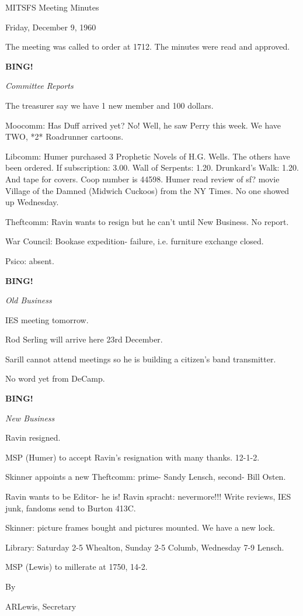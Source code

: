 \documentclass[12pt]{article}
\newcommand{\bing}{{\bf BING!} }
\newcommand{\goto}[1]{\bing \vskip 12pt \centerline{{\em{#1}}}}
\begin{document}
\begin{center}

MITSFS Meeting Minutes

Friday, December 9, 1960

\end{center}
 
\vspace{12pt}

\setlength{\parskip}{6pt}

\noindent
The meeting was called to order at 1712. The minutes were read and approved.

\goto{Committee Reports}

The treasurer say we have 1 new member and 100 dollars.

Moocomm: Has Duff arrived yet? No! Well, he saw Perry this week. We have TWO, *2* Roadrunner cartoons.

Libcomm: Humer purchased 3 Prophetic Novels of H.G. Wells. The others have been ordered. If subscription: 3.00. Wall of Serpents: 1.20. Drunkard's Walk: 1.20. And tape for covers. Coop number is 44598. Humer read review of sf? movie Village of the Damned (Midwich Cuckoos) from the NY Times. No one showed up Wednesday.

Theftcomm: Ravin wants to resign but he can't until New Business. No report.

War Council: Bookase expedition- failure, i.e. furniture exchange closed.

Psico: absent.

\goto{Old Business}

IES meeting tomorrow.

Rod Serling will arrive here 23rd December.

Sarill cannot attend meetings so he is building a citizen's band transmitter.

No word yet from DeCamp.

\goto{New Business}

Ravin resigned.

MSP (Humer) to accept Ravin's resignation with many thanks. 12-1-2.

Skinner appoints a new Theftcomm: prime- Sandy Lensch, second- Bill Osten.

Ravin wants to be Editor- he is! Ravin spracht: nevermore!!! Write reviews, IES junk, fandoms send to Burton 413C.

Skinner: picture frames bought and pictures mounted. We have a new lock.

Library: Saturday 2-5 Whealton, Sunday 2-5 Columb, Wednesday 7-9 Lensch.

MSP (Lewis) to millerate at 1750, 14-2.

\vspace{12pt}

\centerline{By}
\centerline{ARLewis, Secretary}
\end{document}
